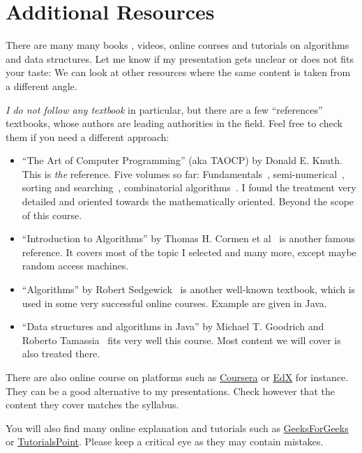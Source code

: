 \documentclass{aldast}
\begin{document}
\section{Additional Resources}

There are many many books
\cite{atto1974,melhorn2008,levitin2011,weiss2014,skiena2020}, videos, online
courses and tutorials on algorithms and data structures. Let me know
if my presentation gets unclear or does not fits your taste: We can
look at other resources where the same content is taken from a
different angle.

\emph{I do not follow any textbook} in particular, but there are a few
``references'' textbooks, whose authors are leading authorities in the
field. Feel free to check them if you need a different approach:

\begin{itemize}
\item ``The Art of Computer Programming'' (aka TAOCP) by Donald
  E. Knuth. This is \emph{the} reference. Five volumes so far:
  Fundamentals~\cite{knuth1978}, semi-numerical~\cite{knuth1997},
  sorting and searching~\cite{knuth1998}, combinato\-rial
  al\-go\-ri\-thms~\cite{knuth2011}. I found the treatment very detailed
  and oriented towards the mathematically oriented. Beyond the scope
  of this course.
\item ``Introduction to Algorithms'' by Thomas H. Cormen et
  al~\cite{cormen2009} is another famous reference. It covers most of
  the topic I selected and many more, except maybe random access
  machines.
\item ``Algorithms'' by Robert Sedgewick~\cite{sedgewick2014} is another
  well-known textbook, which is used in some very successful online
  courses. Example are given in Java.
\item ``Data structures and algorithms in Java'' by Michael
  T. Goodrich and Roberto Tamassia~\cite{goodrich2014} fits very well this
  course. Most content we will cover is also treated there.
\end{itemize}

There are also online course on platforms such as
\href{https://www.coursera.org}{Coursera} or
\href{https://www.edx.org}{EdX} for instance. They can be a good
alternative to my presentations. Check however that the content they
cover matches the syllabus.

You will also find many online explanation and tutorials such as
\href{www.geeksforgeeks.com}{GeeksForGeeks} or
\href{www.tutorialspoint.com}{TutorialsPoint}. Please keep a critical
eye as they may contain mistakes.
\end{document}
